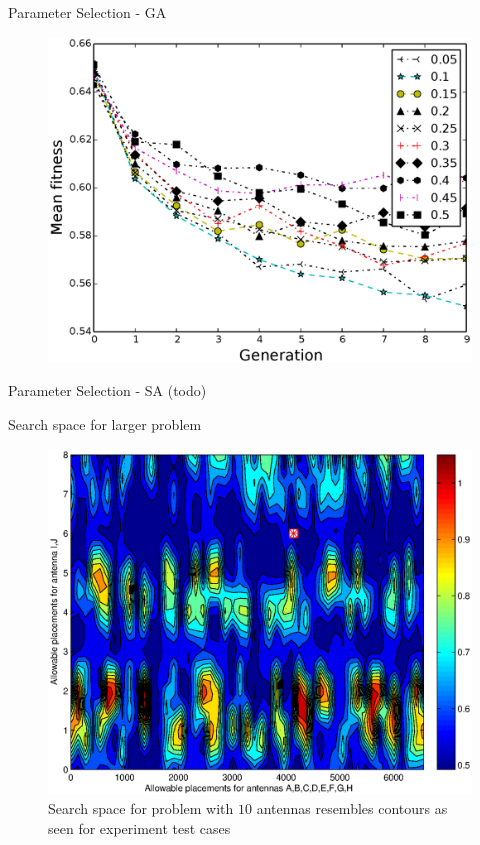 \documentclass{beamer}
\begin{document}
\begin{frame}{Parameter Selection - GA}
 \begin{figure}
\centering
\vspace*{-0.4cm}
    \includegraphics[scale=0.48]{../paper/FIG/ga_mut}%
\end{figure}
\end{frame}

\begin{frame}{Parameter Selection - SA (todo)}
\end{frame}


\begin{frame}{Search space for larger problem}
 \begin{figure}
     \vspace*{-.2cm}
\centering
    \includegraphics[scale=0.5]{../paper/FIG/tc5_contour}%
    \vspace*{-.1cm}
     \caption*{\tiny Search space for problem with $10$ antennas resembles contours as seen for experiment test cases}
\end{figure}
\end{frame}
\end{document}
